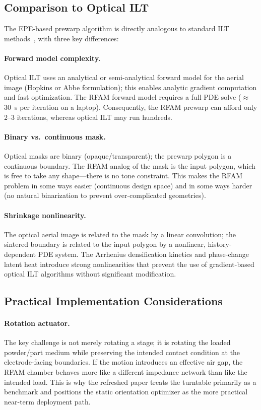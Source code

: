 \documentclass[5p,times]{elsarticle}
\begin{document}
\subsection{Comparison to Optical ILT}

The EPE-based prewarp algorithm is directly analogous to standard ILT
methods~\cite{zhang2023fast,zhu2024l2o,poonawala2007mask}, with three key differences:

\paragraph{Forward model complexity.}
Optical ILT uses an analytical or semi-analytical forward model for the
aerial image (Hopkins or Abbe formulation); this enables analytic
gradient computation and fast optimization.  The RFAM forward model
requires a full PDE solve ($\approx$\SI{30}{\second} per iteration on a
laptop).  Consequently, the RFAM prewarp can afford only 2--3 iterations,
whereas optical ILT may run hundreds.

\paragraph{Binary vs.\ continuous mask.}
Optical masks are binary (opaque/transparent); the prewarp polygon is
a continuous boundary.  The RFAM analog of the mask is the input
polygon, which is free to take any shape---there is no tone
constraint.  This makes the RFAM problem in some ways easier
(continuous design space) and in some ways harder (no natural
binarization to prevent over-complicated geometries).

\paragraph{Shrinkage nonlinearity.}
The optical aerial image is related to the mask by a linear
convolution; the sintered boundary is related to the input polygon by
a nonlinear, history-dependent PDE system.  The Arrhenius densification
kinetics and phase-change latent heat introduce strong nonlinearities
that prevent the use of gradient-based optical ILT algorithms without
significant modification.

\subsection{Practical Implementation Considerations}

\paragraph{Rotation actuator.}
The key challenge is not merely rotating a stage; it is rotating the
loaded powder/part medium while preserving the intended contact
condition at the electrode-facing boundaries.  If the motion introduces
an effective air gap, the RFAM chamber behaves more like a different
impedance network than like the intended load.  This is why the
refreshed paper treats the turntable primarily as a benchmark and
positions the static orientation optimizer as the more practical
near-term deployment path.
\end{document}
